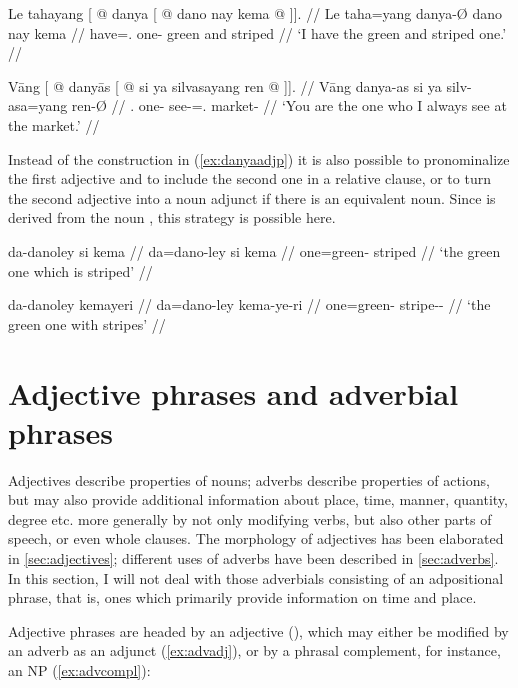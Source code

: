 \pex
\a\label{ex:danyaadjp}\begingl
	\gla Le tahayang {\normalfont [} @ danya {\normalfont 
		[} @ dano nay kema @ {\normalfont]]}. //
	\glb Le taha=yang {} danya-Ø {} dano nay kema {} //
	\glc \PatTI{} have=\Fsg{}.\Aarg{} {} one-\Top{} {} green and striped {} //
	\glft `I have the green and striped one.' //
\endgl

\a\begingl
	\gla Vāng {\normalfont [} @ danyās {\normalfont[} 
		@ si ya silvasayang ren @ {\normalfont ]]}. //
	\glb Vāng {} danya-as {} si ya silv-asa=yang ren-Ø {} //
	\glc \Second.\Aarg{} {} one-\Parg{} {} \Rel{} \LocT{} 
		see-\Hab{}=\Fsg{}.\Aarg{} market-\Top{} {} //
	\glft `You are the one who I always see at the market.' //
\endgl
\xe

Instead of the construction in (\ref{ex:danyaadjp}) it is also possible to
pronominalize the first adjective and to include the second one in a relative 
clause, or to turn the second adjective into a noun adjunct if there is an
equivalent noun. Since  is derived from the noun
, this strategy is possible here.

\pex
\a\begingl
	\gla da-danoley si kema //
	\glb da=dano-ley si kema //
	\glb one=green-\PargI{} \Rel{} striped //
	\glft `the green one which is striped' //
\endgl

\a\begingl
	\gla da-danoley kemayeri //
	\glb da=dano-ley kema-ye-ri //
	\glc one=green-\PargI{} stripe-\Pl{}-\Ins{} //
	\glft `the green one with stripes' //
\endgl

\xe

\section{Adjective phrases and adverbial phrases}

Adjectives describe properties of nouns; adverbs describe properties of actions,
but may also provide additional information about place, time, manner,
quantity, degree etc. more generally by not only modifying verbs, but also other
parts of speech, or even whole clauses. The morphology of adjectives has been 
elaborated in \autoref{sec:adjectives}; different uses of adverbs have been
described in \autoref{sec:adverbs}. In this section, I will not deal with those
adverbials consisting of an adpositional phrase, that is, ones which primarily
provide information on time and place.

Adjective phrases are headed by an adjective (), which may either be
modified by an adverb as an adjunct (\ref{ex:advadj}), or by a phrasal
complement, for instance, an NP (\ref{ex:advcompl}):

